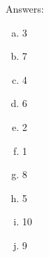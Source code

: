 \documentclass{article}
\begin{document}
\begin{itemize}
    Answers:
    \begin{enumerate}[(a)]
      \item 3
      \item 7
      \item 4
      \item 6
      \item 2
      \item 1
      \item 8
      \item 5
      \item 10
      \item 9
    \end{enumerate}


\end{itemize}
\end{document}
